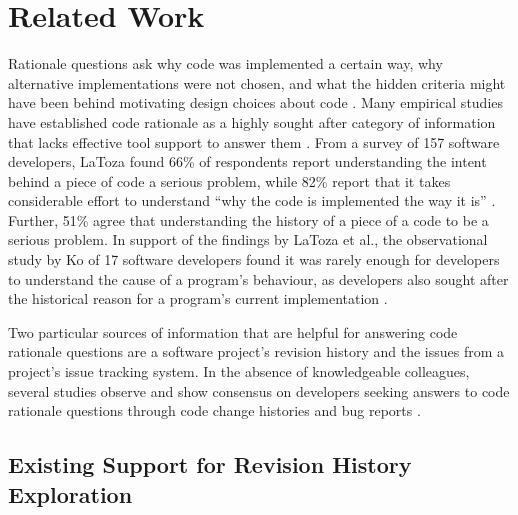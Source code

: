 \chapter{Related Work}
\label{ch:Related-Work}

Rationale questions ask why code was implemented a certain way, 
why alternative implementations were not chosen, and what the hidden criteria might have been 
behind motivating design choices about code \cite{latoza_hard-answer_2010}.
Many empirical studies have established code rationale as a highly sought after category of 
information that lacks effective tool support to answer them \cite{latoza_maintaining_2006, latoza_hard-answer_2010, ko_information_2007}. 
From a survey of 157 software developers, LaToza \etal found 66\% of respondents report understanding 
the intent behind a piece of code  a serious problem, 
while 82\% report that it takes considerable effort to understand ``why the code is implemented the way it is'' \cite{latoza_maintaining_2006}.
Further, 51\% agree that understanding the history of a piece of a code to be a serious problem.
In support of the findings by LaToza et al., the observational study by Ko \etal of 17 software 
developers found it was rarely enough for developers to understand the cause of a program's behaviour, 
as developers also sought after the historical reason for a program's current implementation \cite{ko_information_2007}.

Two particular sources of information that are helpful for answering code rationale questions 
are a software project's revision history and the issues from a project's issue tracking system. 
In the absence of knowledgeable colleagues, several studies observe and show consensus 
on developers seeking answers to code rationale questions through code change histories 
and bug reports \cite{ko_information_2007, codoban_software_2015, robillard_turnover-induced_2021}.


\pagebreak
\section{Existing Support for Revision History Exploration}


